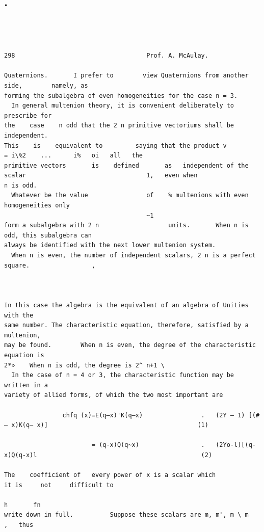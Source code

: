 \documentclass[10pt]{article}
\begin{document}
\begin{verbatim}

                                                                                    •




298                                    Prof. A. McAulay.

Quaternions.       I prefer to        view Quaternions from another                                side,        namely, as
forming the subalgebra of even homogeneities for the case n = 3.
  In general multenion theory, it is convenient deliberately to prescribe for
the    case    n odd that the 2 n primitive vectoriums shall be independent.
This    is    equivalent to         saying that the product v                           = i\%2    ...      i%   oi   all   the
primitive vectors       is    defined       as   independent of the scalar                                 1,   even when
n is odd.
  Whatever be the value                of    % multenions with even homogeneities only
                                       ~1
form a subalgebra with 2 n                   units.       When n is odd, this subalgebra can
always be identified with the next lower multenion system.
  When n is even, the number of independent scalars, 2 n is a perfect square.                 ,



In this case the algebra is the equivalent of an algebra of Unities with the
same number. The characteristic equation, therefore, satisfied by a multenion,
may be found.        When n is even, the degree of the characteristic equation is
2*»    When n is odd, the degree is 2^ n+1 \
  In the case of n = 4 or 3, the characteristic function may be written in a
variety of allied forms, of which the two most important are

                chfq (x)=E(q—x)'K(q—x)                .   (2Y — 1) [(#— x)K(q— x)]                                         (1)

                        = (q-x)Q(q~x)                 .   (2Yo-l)[(q-x)Q(q-x)l                                             (2)

The    coefficient of   every power of x is a scalar which                                    it is     not     difficult to
                                                                                          h       fn
write down in full.          Suppose these scalars are m, m', m \ m                                    ,   thus


\end{verbatim}
\end{document}
